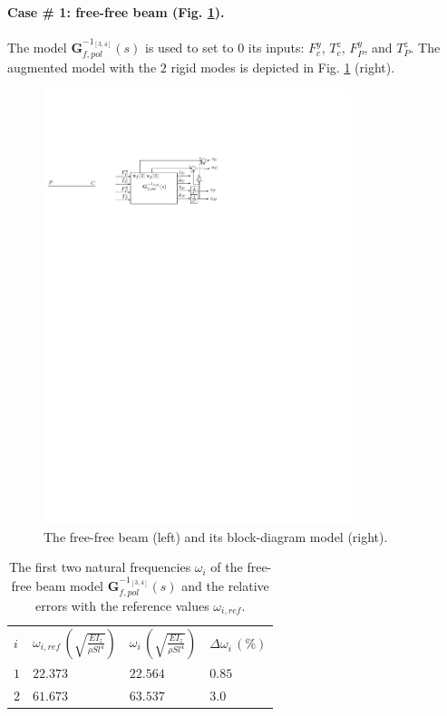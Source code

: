 \documentclass[smallcondensed]{svjour3}     %
\begin{document}
\paragraph{Case \# 1: free-free beam (Fig. \ref{fig:Tff}).} The model $\mathbf{G}_{f,pol}^{-1_{[3,4]}}(s)$ is  used to set to $0$ its inputs: $F^y_c$, $T^z_c$, $F^y_P$, and $T^z_P$. The augmented model with the $2$ rigid modes is depicted in Fig. \ref{fig:Tff} (right).
\begin{figure}[htbp!]
  \includegraphics[width=0.8\textwidth]{Tffb}
\caption{The free-free beam (left) and its block-diagram model (right).}
\label{fig:Tff} 
\end{figure}
\begin{table}[htbp!]
\caption{The first two natural frequencies $\omega_i$ of the free-free beam model $\mathbf{G}_{f,pol}^{-1_{[3,4]}}(s)$ and the relative errors with the reference values $\omega_{i,ref}$.}
\label{tab:Tff}       %
\begin{tabular}{llll}
\hline\noalign{\smallskip}
  $i$ & $\omega_{i,ref}\,\left(\sqrt{\frac{EI_z}{\rho S l^4}}\right)$ &  $\omega_i\,\left(\sqrt{\frac{EI_z}{\rho S l^4}}\right)$ &  $\Delta \omega_i\,(\%)$ \\
\noalign{\smallskip}\hline\noalign{\smallskip}
$1$ & $22.373$ & $22.564$  & $0.85$ \\ 
$2$ & $61.673$ & $63.537$ & $3.0$ \\
\hline
\end{tabular}
\end{table}
\end{document}
